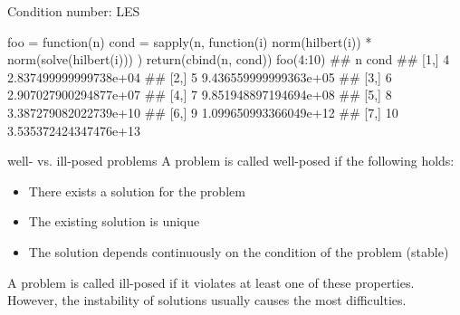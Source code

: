 \begin{vbframe}{Condition number: LES}
\footnotesize
\begin{verbbox}
foo = function(n) {
  cond = sapply(n, function(i) {
    norm(hilbert(i)) * norm(solve(hilbert(i)))
  })
  return(cbind(n, cond))
}
foo(4:10)                                                                                                                                                                                                                
##      n                  cond
## [1,] 4 2.837499999999738e+04
## [2,] 5 9.436559999999363e+05
## [3,] 6 2.907027900294877e+07
## [4,] 7 9.851948897194694e+08
## [5,] 8 3.387279082022739e+10
## [6,] 9 1.099650993366049e+12
## [7,] 10 3.535372424347476e+13
\end{verbbox}
\col
\end{vbframe}


\begin{vbframe}{well- vs. ill-posed problems}
A problem is called well-posed if the following holds:
\begin{itemize}
\item There exists a solution for the problem
\item The existing solution is unique
\item The solution depends continuously on the condition of the problem (stable)
\end{itemize}
A problem is called ill-posed if it violates at least one of these properties. However, the instability of solutions usually causes the most difficulties.
\end{vbframe}


